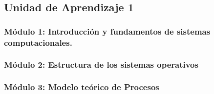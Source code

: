 \subsection{Unidad de Aprendizaje 1}

\subsubsection{Módulo 1: Introducción y fundamentos de sistemas computacionales.}

\subsubsection{Módulo 2: Estructura de los sistemas operativos}

\subsubsection{Módulo 3: Modelo teórico de Procesos}